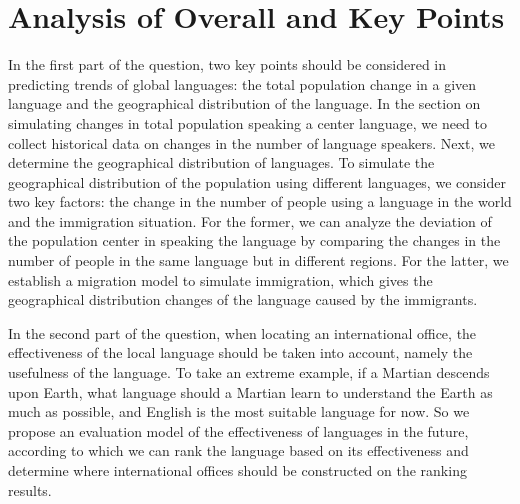 \section{Analysis of Overall and Key Points}
\noindent In the first part of the question, two key points should be considered in predicting trends of global languages: the total population change in a given language and the geographical distribution of the language. In the section on simulating changes in total population speaking a center language, we need to collect historical data on changes in the number of language speakers. Next, we determine the geographical distribution of languages. To simulate the geographical distribution of the population using different languages, we consider two key factors: the change in the number of people using a language in the world and the immigration situation. For the former, we can analyze the deviation of the population center in speaking the language by comparing the changes in the number of people in the same language but in different regions. For the latter, we establish a migration model to simulate immigration, which gives the geographical distribution changes of the language caused by the immigrants.
\par In the second part of the question, when locating an international office, the effectiveness of the local language should be taken into account, namely the usefulness of the language. To take an extreme example, if a Martian descends upon Earth, what language should a Martian learn to understand the Earth as much as possible, and English is the most suitable language for now. So we propose an evaluation model of the effectiveness of languages in the future, according to which we can rank the language based on its effectiveness and determine where international offices should be constructed on the ranking results.